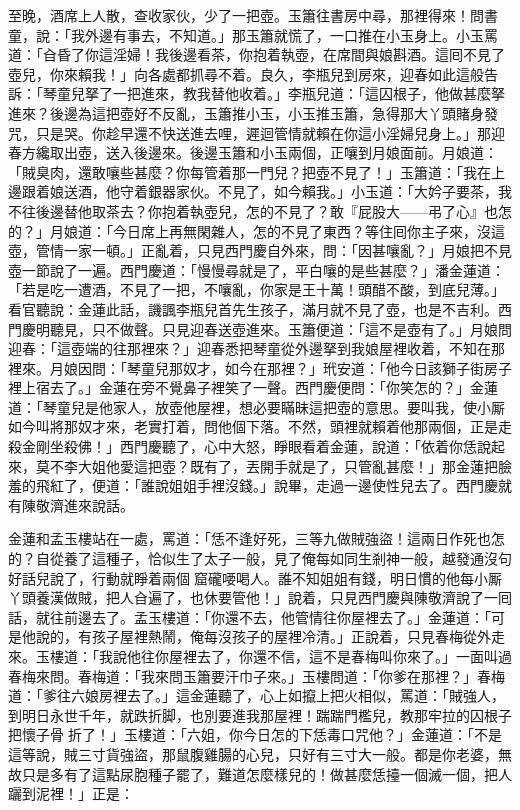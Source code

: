 至晚，酒席上人散，查收家伙，少了一把壺。玉簫往書房中尋，那裡得來！問書童，說：「我外邊有事去，不知道。」那玉簫就慌了，一口推在小玉身上。小玉罵道：「㒲昏了你這淫婦！我後邊看茶，你抱着執壺，在席間與娘斟酒。這囘不見了壺兒，你來賴我！」向各處都抓尋不着。良久，李瓶兒到房來，迎春如此這般告訴：「琴童兒拏了一把進來，教我替他收着。」李瓶兒道：「這囚根子，他做甚麼拏進來？後邊為這把壺好不反亂，玉簫推小玉，小玉推玉簫，急得那大丫頭賭身發咒，只是哭。你趁早還不快送進去哩，遲迴管情就賴在你這小淫婦兒身上。」那迎春方纔取出壺，送入後邊來。後邊玉簫和小玉兩個，正嚷到月娘面前。月娘道：「賊臭肉，還敢嚷些甚麼？你每管着那一門兒？把壺不見了！」玉簫道：「我在上邊跟着娘送酒，他守着銀器家伙。不見了，如今賴我。」小玉道：「大妗子要茶，我不往後邊替他取茶去？你抱着執壺兒，怎的不見了？敢『屁股大——弔了心』也怎的？」月娘道：「今日席上再無閑雜人，怎的不見了東西？等住囘你主子來，沒這壺，管情一家一頓。」正亂着，只見西門慶自外來，問：「因甚嚷亂？」月娘把不見壺一節說了一遍。西門慶道：「慢慢尋就是了，平白嚷的是些甚麼？」潘金蓮道：「若是吃一遭酒，不見了一把，不嚷亂，你家是王十萬！頭醋不酸，到底兒薄。」{}看官聽說：金蓮此話，譏諷李瓶兒首先生孩子，滿月就不見了壺，也是不吉利。西門慶明聽見，只不做聲。只見迎春送壺進來。玉簫便道：「這不是壺有了。」月娘問迎春：「這壺端的往那裡來？」迎春悉把琴童從外邊拏到我娘屋裡收着，不知在那裡來。月娘因問：「琴童兒那奴才，如今在那裡？」玳安道：「他今日該獅子街房子裡上宿去了。」金蓮在旁不覺鼻子裡笑了一聲。西門慶便問：「你笑怎的？」金蓮道：「琴童兒是他家人，放壺他屋裡，想必要瞞昧這把壺的意思。要叫我，使小厮如今叫將那奴才來，老實打着，問他個下落。不然，頭裡就賴着他那兩個，正是走殺金剛坐殺佛！」西門慶聽了，心中大怒，睜眼看着金蓮，{}說道：「依着你恁說起來，莫不李大姐他愛這把壺？既有了，丟開手就是了，只管亂甚麼！」那金蓮把臉羞的飛紅了，便道：「誰說姐姐手裡沒錢。」說畢，走過一邊使性兒去了。西門慶就有陳敬濟進來說話。

金蓮和孟玉樓站在一處，罵道：「恁不逢好死，三等九做賊強盜！這兩日作死也怎的？自從養了這種子，恰似生了太子一般，見了俺每如同生剎神一般，越發通沒句好話兒說了，行動就睜着兩個𣭈窟礲喓喝人。誰不知姐姐有錢，明日慣的他每小厮丫頭養漢做賊，把人㒲遍了，也休要管他！」說着，只見西門慶與陳敬濟說了一囘話，就往前邊去了。孟玉樓道：「你還不去，他管情往你屋裡去了。」金蓮道：「可是他說的，有孩子屋裡熱鬧，俺每沒孩子的屋裡冷清。」正說着，只見春梅從外走來。玉樓道：「我說他往你屋裡去了，你還不信，這不是春梅叫你來了。」一面叫過春梅來問。春梅道：「我來問玉簫要汗巾子來。」{}玉樓問道：「你爹在那裡？」春梅道：「爹往六娘房裡去了。」這金蓮聽了，心上如攛上把火相似，罵道：「賊強人，到明日永世千年，就跌折脚，也別要進我那屋裡！踹踹門檻兒，教那牢拉的囚根子把懷子骨𢱉折了！」玉樓道：「六姐，你今日怎的下恁毒口咒他？」金蓮道：「不是這等說，賊三寸貨強盜，那鼠腹雞腸的心兒，只好有三寸大一般。都是你老婆，無故只是多有了這點尿胞種子罷了，難道怎麼樣兒的！做甚麼恁擡一個滅一個，把人躧到泥裡！」正是：

